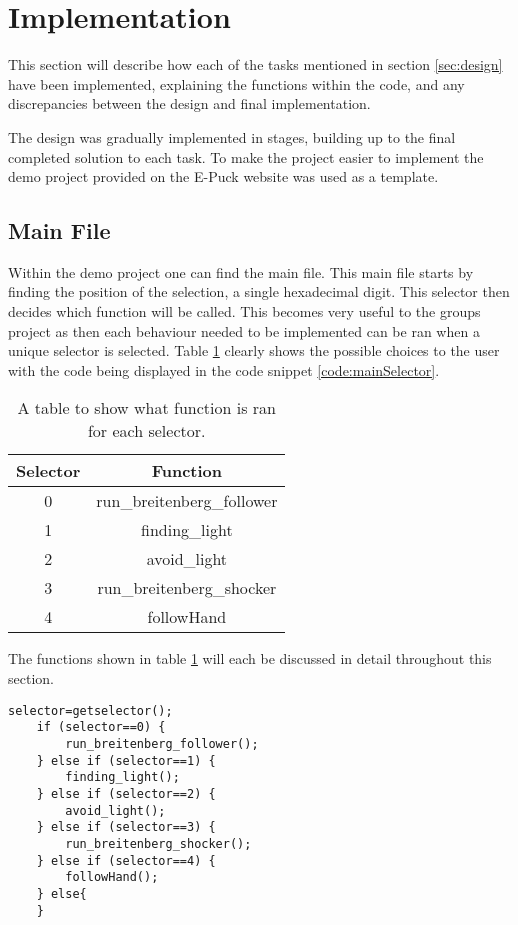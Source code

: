 \section{Implementation}
\label{sec:implementation}
This section will describe how each of the tasks mentioned in section \ref{sec:design} have been implemented, explaining the functions within the code, and any discrepancies between the design and final implementation.

The design was gradually implemented in stages, building up to the final completed solution to each task. To make the project easier to implement the demo project provided on the E-Puck\cite{epuck} website was used as a template.
\subsection{Main File}
Within the demo project one can find the main file. This main file starts by finding the position of the selection, a single hexadecimal digit. This selector then decides which function will be called. This becomes very useful to the groups project as then each behaviour needed to be implemented can be ran when a unique selector is selected. Table \ref{table:selectorOptions} clearly shows the possible choices to the user with the code being displayed in the code snippet \ref{code:mainSelector}.

\begin{table}
	\centering
	\begin{tabular}{|c | c|} 
	\hline
	Selector & Function \\ \hline
	0 & run\_breitenberg\_follower \\ \hline
	1 & finding\_light \\ \hline
	2 & avoid\_light \\ \hline
	3 & run\_breitenberg\_shocker \\ \hline
	4 & followHand \\ \hline
	\end{tabular}
	\label{table:selectorOptions}
	\caption{A table to show what function is ran for each selector.}
\end{table}

The functions shown in table \ref{table:selectorOptions} will each be discussed in detail throughout this section.

\begin{lstlisting}[caption={Processes for selecting which function to run},label=code:mainSelector, float,floatplacement=H]
	selector=getselector();
	if (selector==0) {
		run_breitenberg_follower();
	} else if (selector==1) {
		finding_light();
	} else if (selector==2) {
		avoid_light();
	} else if (selector==3) {
		run_breitenberg_shocker();
	} else if (selector==4) {
		followHand();
	} else{
	}
\end{lstlisting}

